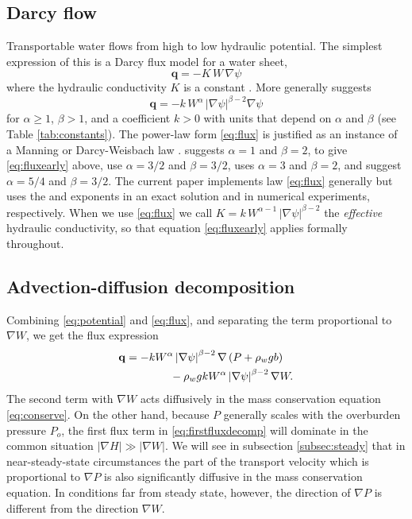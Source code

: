 \documentclass[gmd]{copernicus}   %
\newcommand\bq{\mathbf{q}}
\newcommand{\grad}{\nabla}
\begin{document}
\subsection{Darcy flow}  Transportable water flows from high to low hydraulic potential.  The simplest expression of this is a Darcy flux model for a water sheet,
\begin{equation}  \label{eq:fluxearly}
\bq = - K \,W\, \grad \psi
\end{equation}
where the hydraulic conductivity $K$ is a constant \citep{Clarke05}.  More generally \cite{Schoofetal2012} suggests
\begin{equation}  \label{eq:flux}
\bq = - k\, W^\alpha\, |\grad \psi|^{\beta-2} \grad \psi
\end{equation}
for $\alpha \ge 1$, $\beta>1$, and a coefficient $k>0$ with units that depend on $\alpha$ and $\beta$ (see Table \ref{tab:constants}).  The power-law form \eqref{eq:flux} is justified as an instance of a Manning or Darcy-Weisbach law \citep{Schoofetal2012}.  \cite{Clarke05} suggests $\alpha=1$ and $\beta=2$, to give \eqref{eq:fluxearly} above, \cite{CreytsSchoof2009} use $\alpha=3/2$ and $\beta=3/2$, \cite{Hewitt2011,Hewitt2013} uses $\alpha=3$ and $\beta = 2$, and \cite{Hewittetal2012} suggest $\alpha=5/4$ and $\beta=3/2$.  The current paper implements law \eqref{eq:flux} generally but uses the \cite{Clarke05} and \cite{Hewittetal2012} exponents in an exact solution and in numerical experiments, respectively.  When we use \eqref{eq:flux} we call $K = k\, W^{\alpha-1}\, |\grad \psi|^{\beta-2}$ the \emph{effective} hydraulic conductivity, so that equation \eqref{eq:fluxearly} applies formally throughout.

\subsection{Advection-diffusion decomposition}  Combining \eqref{eq:potential} and \eqref{eq:flux}, and separating the term proportional to $\grad W$, we get the flux expression
\begin{align}
\bq &= - k  W^\alpha \left|\grad \psi\right|^{\beta-2} \grad \left(P + \rho_w g b\right)  \label{eq:firstfluxdecomp} \\
    &\qquad\qquad - \rho_w g k W^\alpha \left|\grad \psi\right|^{\beta-2} \grad W.  \notag
\end{align}
The second term with $\grad W$ acts diffusively in the mass conservation equation \eqref{eq:conserve}.  On the other hand, because $P$ generally scales with the overburden pressure $P_o$, the first flux term in \eqref{eq:firstfluxdecomp} will dominate in the common situation $|\grad H| \gg |\grad W|$.  We will see  in subsection \ref{subsec:steady} that in near-steady-state circumstances the part of the transport velocity which is proportional to $\grad P$ is also significantly diffusive in the mass conservation equation.  In conditions far from steady state, however, the direction of $\grad P$ is different from the direction $\grad W$.
\end{document}
